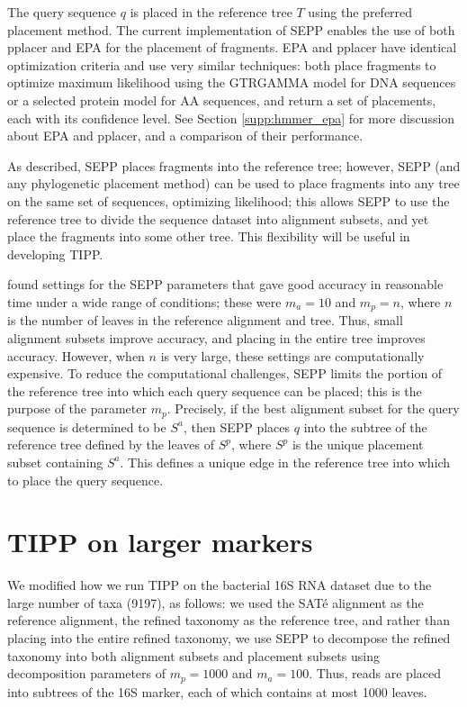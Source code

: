 The query sequence $q$ is placed in the reference tree
$T$
using the  preferred  placement method.
The current implementation of SEPP enables the use of both
pplacer and EPA for the placement of
fragments. EPA and pplacer 
have identical optimization criteria and
use very similar techniques:
both
place fragments to optimize maximum likelihood
using  
the GTRGAMMA model for DNA sequences or a selected protein model 
for AA sequences, and 
return a set of placements, each with
its confidence level. See Section \ref{supp:hmmer_epa} for more discussion
about EPA and pplacer, and a comparison of their
performance. 

As described, SEPP places fragments into the reference tree;
however, SEPP (and any
phylogenetic placement method) can be used to 
place fragments into any tree on the same set of sequences,
optimizing likelihood; this allows SEPP to use the
reference tree to divide the sequence dataset into
alignment subsets, and yet place 
the fragments into some other tree. 
This flexibility will be useful in developing TIPP.

\cite{Mirarab2012} found
settings for the
SEPP parameters that gave good accuracy in
reasonable time under a wide range of conditions; these were
$m_a=10$ and
$m_p=n$, where $n$ is the number of leaves in the reference alignment and tree.
Thus, small alignment subsets improve accuracy, and
placing in the entire tree improves accuracy.
However, when $n$ is very large, 
these settings are computationally expensive.
To reduce the computational challenges, SEPP limits the 
portion of the reference tree into which each query sequence can be placed;
this is the purpose of the parameter $m_p$.
Precisely, if the best alignment subset
for the query sequence is determined to be
$S^a$, 
then SEPP places $q$ into the subtree of
the reference tree defined by 
the leaves of $S^p$, where $S^p$ is the unique placement subset
containing $S^a$.
This defines a unique edge in the reference
tree into which to place the query sequence.

\section{TIPP on larger markers}\label{supp:large_marker}
We modified how we run TIPP on the bacterial 16S RNA
dataset due to the large number of taxa (9197),
as follows: we used the SAT\'{e} alignment
as the reference alignment, the
refined taxonomy as the reference tree, and rather
than placing into the entire refined taxonomy, we use
SEPP to decompose the refined taxonomy into both alignment
subsets and placement subsets using decomposition
parameters of $m_p=1000$ and $m_a=100$.  Thus, reads are
placed into subtrees of the 16S marker, each of which
contains at most 1000 leaves.


